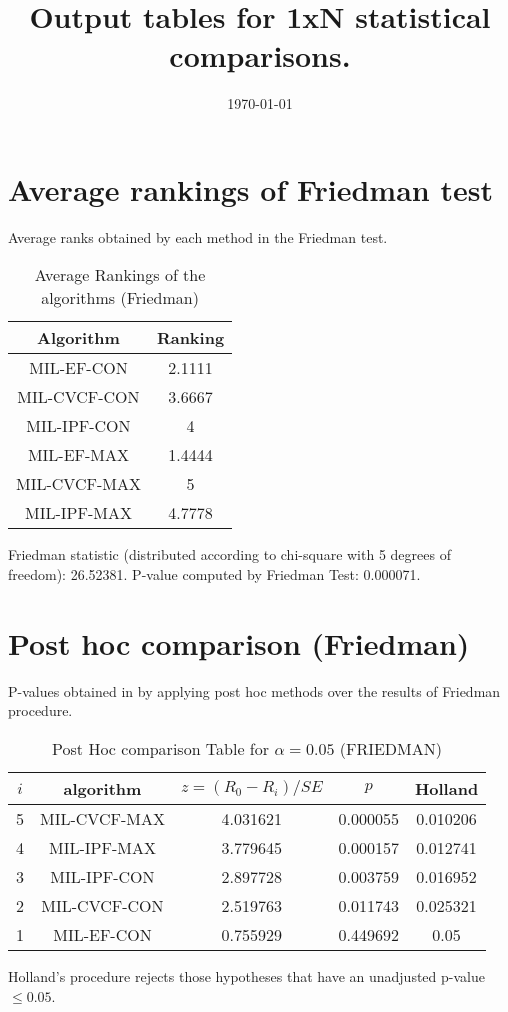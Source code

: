\documentclass[a4paper,10pt]{article}
\title{Output tables for 1xN statistical comparisons.}
\author{}
\date{\today}
\begin{document}
\begin{landscape}
\pagestyle{empty}
\maketitle
\thispagestyle{empty}

\section{Average rankings of Friedman test}


Average ranks obtained by each method in the Friedman test.

\begin{table}[!htp]
\centering
\begin{tabular}{|c|c|}\hline
Algorithm&Ranking\\\hline
MIL-EF-CON&2.1111\\MIL-CVCF-CON&3.6667\\MIL-IPF-CON&4\\MIL-EF-MAX&1.4444\\MIL-CVCF-MAX&5\\MIL-IPF-MAX&4.7778\\\hline\end{tabular}
\caption{Average Rankings of the algorithms (Friedman)}
\end{table}

Friedman statistic (distributed according to chi-square with 5 degrees of freedom): 26.52381. \newline P-value computed by Friedman Test: 0.000071.\newline


\newpage

\section{Post hoc comparison (Friedman)}


P-values obtained in by applying post hoc methods over the results of Friedman procedure.

\begin{table}[!htp]
\centering\footnotesize
\begin{tabular}{ccccc}
$i$&algorithm&$z=(R_0 - R_i)/SE$&$p$&Holland\\
\hline5&MIL-CVCF-MAX&4.031621&0.000055&0.010206\\4&MIL-IPF-MAX&3.779645&0.000157&0.012741\\3&MIL-IPF-CON&2.897728&0.003759&0.016952\\2&MIL-CVCF-CON&2.519763&0.011743&0.025321\\1&MIL-EF-CON&0.755929&0.449692&0.05\\\hline
\end{tabular}
\caption{Post Hoc comparison Table for $\alpha=0.05$ (FRIEDMAN)}
\end{table}Holland's procedure rejects those hypotheses that have an unadjusted p-value $\le0.05$.



\end{landscape}
\end{document}
